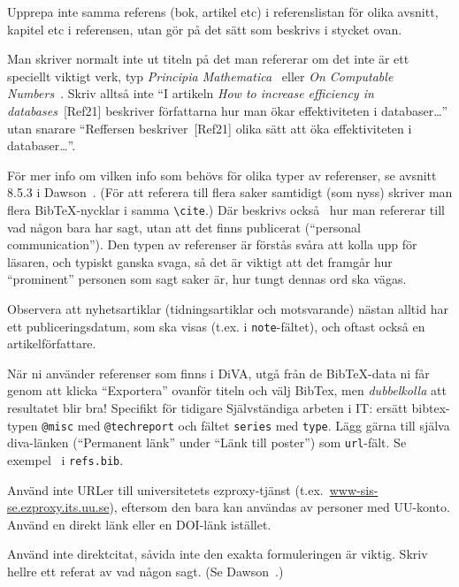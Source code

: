 Upprepa inte samma referens (bok, artikel etc) i referenslistan för olika avsnitt, kapitel etc i referensen, utan gör på det sätt som beskrivs i stycket ovan.

Man skriver normalt inte ut titeln på det man refererar om det inte är ett speciellt viktigt verk, typ \emph{Principia Mathematica}~\cite{whitehead.russel:principia-mathematica} eller \emph{On Computable Numbers}~\cite{turing:computable-numbers}. Skriv alltså inte ``I artikeln \emph{How to increase efficiency in databases}~[Ref21] beskriver författarna hur man ökar effektiviteten i databaser\ldots'' utan snarare ``Reffersen beskriver~[Ref21] olika sätt att öka effektiviteten i databaser\ldots''.

För mer info om vilken info som behövs för olika typer av referenser, se avsnitt 8.5.3 i Dawson~\cite{dawson:projects-in-computing,dawson:projects-in-computing-old}. (För att referera till flera saker samtidigt (som nyss) skriver man flera BibTeX-nycklar i samma \verb|\cite|.) 
Där beskrivs också~\cite[sid 230]{dawson:projects-in-computing} hur man refererar till vad någon bara har sagt, utan att det finns publicerat (``personal communication''). Den typen av referenser är förstås svåra att kolla upp för läsaren, och typiskt ganska svaga, så det är viktigt att det framgår hur ``prominent'' personen som sagt saker är, hur tungt dennas ord ska vägas.

Observera att nyhetsartiklar (tidningsartiklar och motsvarande) nästan alltid har ett publiceringsdatum, som ska visas (t.ex. i \verb|note|-fältet), och oftast också en artikelförfattare.

När ni använder referenser som finns i DiVA, utgå från de Bib\TeX-data ni får genom att klicka ``Exportera'' ovanför titeln och välj BibTex, men \emph{dubbelkolla} att resultatet blir bra! Specifikt för tidigare Självständiga arbeten i IT: ersätt bibtex-typen \verb|@misc| med \verb|@techreport| och fältet \verb|series| med \verb|type|. Lägg gärna till själva diva-länken (``Permanent länk'' under ``Länk till poster'') som \verb|url|-fält. Se exempel~\cite{Brane973772,Alstergren1439802} i \texttt{refs.bib}.

Använd inte URLer till universitetets ezproxy-tjänst (t.ex.~\url{www-sis-se.ezproxy.its.uu.se}), eftersom den bara kan användas av personer med UU-konto. Använd en direkt länk eller en DOI-länk istället.

Använd inte direktcitat, såvida inte den exakta formuleringen är viktig.  Skriv hellre ett referat av vad någon sagt. (Se Dawson~\cite{dawson:projects-in-computing,dawson:projects-in-computing-old}.)


